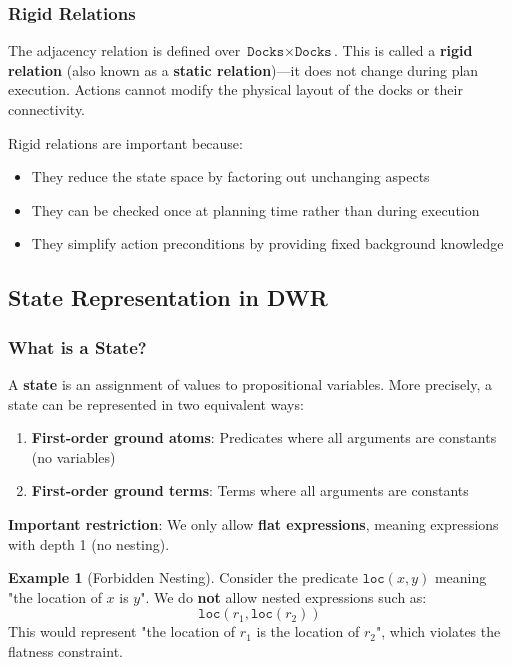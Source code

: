 \documentclass[11pt,a4paper]{article}
\theoremstyle{definition}
\newtheorem{example}{Example}[section]
\theoremstyle{plain}
\theoremstyle{remark}
\begin{document}
\subsubsection{Rigid Relations}

The adjacency relation is defined over $\texttt{Docks} \times \texttt{Docks}$. This is called a \textbf{rigid relation} (also known as a \textbf{static relation})—it does not change during plan execution. Actions cannot modify the physical layout of the docks or their connectivity.

Rigid relations are important because:
\begin{itemize}
    \item They reduce the state space by factoring out unchanging aspects
    \item They can be checked once at planning time rather than during execution
    \item They simplify action preconditions by providing fixed background knowledge
\end{itemize}

\subsection{State Representation in DWR}

\subsubsection{What is a State?}

A \textbf{state} is an assignment of values to propositional variables. More precisely, a state can be represented in two equivalent ways:

\begin{enumerate}
    \item \textbf{First-order ground atoms}: Predicates where all arguments are constants (no variables)
    \item \textbf{First-order ground terms}: Terms where all arguments are constants
\end{enumerate}

\textbf{Important restriction}: We only allow \textbf{flat expressions}, meaning expressions with depth 1 (no nesting).

\begin{example}[Forbidden Nesting]
Consider the predicate $\texttt{loc}(x, y)$ meaning "the location of $x$ is $y$". We do \textbf{not} allow nested expressions such as:
\[
\texttt{loc}(r_1, \texttt{loc}(r_2))
\]
This would represent "the location of $r_1$ is the location of $r_2$", which violates the flatness constraint.
\end{example}
\end{document}
